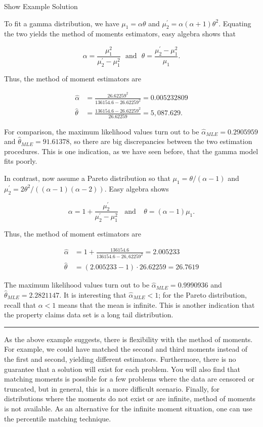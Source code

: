 \documentclass[]{book}
\theoremstyle{definition}
\theoremstyle{definition}
\theoremstyle{definition}
\theoremstyle{remark}
\begin{document}
Show Example Solution

\hypertarget{toggleExampleMM}{}
To fit a gamma distribution, we have \(\mu_1 = \alpha \theta\) and
\(\mu_2^{\prime} = \alpha(\alpha+1) \theta^2\). Equating the two yields
the method of moments estimators, easy algebra shows that

\[\alpha = \frac{\mu_1^2}{\mu_2^{\prime}-\mu_1^2}  \ \ \ \text{and} \ \ \  \theta = \frac{\mu_2^{\prime}-\mu_1^2}{\mu_1}.\]

Thus, the method of moment estimators are

\[\begin{aligned}
\hat{\alpha} &=  \frac{26.62259^2}{136154.6-26.62259^2} = 0.005232809 \\
\hat{\theta} &=  \frac{136154.6-26.62259^2}{26.62259} = 5,087.629.
\end{aligned}\]

For comparison, the maximum likelihood values turn out to be
\(\hat{\alpha}_{MLE} = 0.2905959\) and
\(\hat{\theta}_{MLE} = 91.61378\), so there are big discrepancies
between the two estimation procedures. This is one indication, as we
have seen before, that the gamma model fits poorly.

In contrast, now assume a Pareto distribution so that
\(\mu_1 = \theta/(\alpha -1)\) and
\(\mu_2^{\prime} = 2\theta^2/((\alpha-1)(\alpha-2) )\). Easy algebra
shows

\[\alpha = 1+ \frac{\mu_2^{\prime}}{\mu_2^{\prime}-\mu_1^2} \ \ \ \
\text{and} \ \ \ \ \
 \theta = (\alpha-1)\mu_1.\]

Thus, the method of moment estimators are

\[\begin{aligned}
\hat{\alpha} &=  1+ \frac{136154.6}{136154.6-26,62259^2} = 2.005233 \\
\hat{\theta} &=  (2.005233-1) \cdot 26.62259 = 26.7619
\end{aligned}\]

The maximum likelihood values turn out to be
\(\hat{\alpha}_{MLE} = 0.9990936\) and
\(\hat{\theta}_{MLE} = 2.2821147\). It is interesting that
\(\hat{\alpha}_{MLE}<1\); for the Pareto distribution, recall that
\(\alpha <1\) means that the mean is infinite. This is another
indication that the property claims data set is a long tail
distribution.

\begin{center}\rule{0.5\linewidth}{\linethickness}\end{center}

As the above example suggests, there is flexibility with the method of
moments. For example, we could have matched the second and third moments
instead of the first and second, yielding different estimators.
Furthermore, there is no guarantee that a solution will exist for each
problem. You will also find that matching moments is possible for a few
problems where the data are censored or truncated, but in general, this
is a more difficult scenario. Finally, for distributions where the
moments do not exist or are infinite, method of moments is not
available. As an alternative for the infinite moment situation, one can
use the percentile matching technique.
\end{document}
